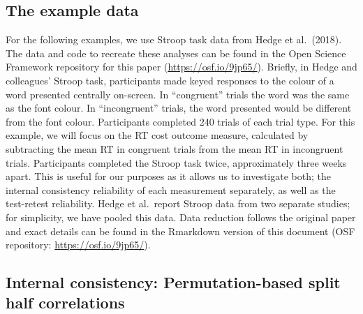 \documentclass[english,,man,floatsintext]{apa6}
\begin{document}
\hypertarget{the-example-data}{%
\subsection{The example data}\label{the-example-data}}

For the following examples, we use Stroop task data from Hedge et al.~(2018). The data and code to recreate these analyses can be found in the Open Science Framework repository for this paper (\url{https://osf.io/9jp65/}). Briefly, in Hedge and colleagues' Stroop task, participants made keyed responses to the colour of a word presented centrally on-screen. In \enquote{congruent} trials the word was the same as the font colour. In \enquote{incongruent} trials, the word presented would be different from the font colour. Participants completed 240 trials of each trial type. For this example, we will focus on the RT cost outcome measure, calculated by subtracting the mean RT in congruent trials from the mean RT in incongruent trials. Participants completed the Stroop task twice, approximately three weeks apart. This is useful for our purposes as it allows us to investigate both; the internal consistency reliability of each measurement separately, as well as the test-retest reliability. Hedge et al.~report Stroop data from two separate studies; for simplicity, we have pooled this data. Data reduction follows the original paper and exact details can be found in the Rmarkdown version of this document (OSF repository: \url{https://osf.io/9jp65/}).

\hypertarget{internal-consistency-permutation-based-split-half-correlations}{%
\subsection{Internal consistency: Permutation-based split half correlations}\label{internal-consistency-permutation-based-split-half-correlations}}
\end{document}

